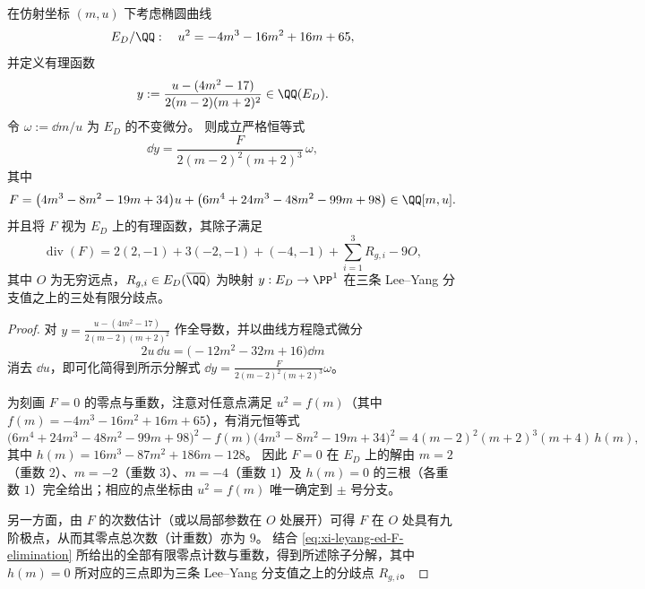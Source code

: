 \begin{theorem}\label{thm:xi-leyang-ed-dy-explicit-divisor}
在仿射坐标 \((m,u)\) 下考虑椭圆曲线
\[
E_D/\QQ:\quad u^2=-4m^3-16m^2+16m+65,
\]
并定义有理函数
\[
y
:=\frac{u-(4m^2-17)}{2(m-2)(m+2)^2}\in\QQ(E_D).
\]
令 \(\omega:=\dd m/u\) 为 \(E_D\) 的不变微分。
则成立严格恒等式
\[
\dd y=\frac{F}{2(m-2)^2(m+2)^3}\,\omega,
\]
其中
\[
F=\bigl(4m^3-8m^2-19m+34\bigr)u+\bigl(6m^4+24m^3-48m^2-99m+98\bigr)\in\QQ[m,u].
\]
并且将 \(F\) 视为 \(E_D\) 上的有理函数，其除子满足
\[
\operatorname{div}(F)
=2(2,-1)+3(-2,-1)+(-4,-1)+\sum_{i=1}^{3}R_{g,i}-9O,
\]
其中 \(O\) 为无穷远点，\(R_{g,i}\in E_D(\overline\QQ)\) 为映射 \(y:E_D\to\PP^1\) 在三条 Lee--Yang 分支值之上的三处有限分歧点。
\end{theorem}
\begin{proof}
对 \(y=\frac{u-(4m^2-17)}{2(m-2)(m+2)^2}\) 作全导数，并以曲线方程隐式微分
\[
2u\,\dd u=\bigl(-12m^2-32m+16\bigr)\dd m
\]
消去 \(\dd u\)，即可化简得到所示分解式 \(\dd y=\frac{F}{2(m-2)^2(m+2)^3}\omega\)。
\par
为刻画 \(F=0\) 的零点与重数，注意对任意点满足 \(u^2=f(m)\)（其中 \(f(m)=-4m^3-16m^2+16m+65\)），有消元恒等式
\begin{equation}\label{eq:xi-leyang-ed-F-elimination}
\bigl(6m^4+24m^3-48m^2-99m+98\bigr)^2
-f(m)\bigl(4m^3-8m^2-19m+34\bigr)^2
=4(m-2)^2(m+2)^3(m+4)\,h(m),
\end{equation}
其中
\(
h(m)=16m^3-87m^2+186m-128
\)。
因此 \(F=0\) 在 \(E_D\) 上的解由 \(m=2\)（重数 \(2\)）、\(m=-2\)（重数 \(3\)）、\(m=-4\)（重数 \(1\)）及 \(h(m)=0\) 的三根（各重数 \(1\)）完全给出；相应的点坐标由 \(u^2=f(m)\) 唯一确定到 \(\pm\) 号分支。
\par
另一方面，由 \(F\) 的次数估计（或以局部参数在 \(O\) 处展开）可得 \(F\) 在 \(O\) 处具有九阶极点，从而其零点总次数（计重数）亦为 \(9\)。
结合 \eqref{eq:xi-leyang-ed-F-elimination} 所给出的全部有限零点计数与重数，得到所述除子分解，其中 \(h(m)=0\) 所对应的三点即为三条 Lee--Yang 分支值之上的分歧点 \(R_{g,i}\)。
\end{proof}

